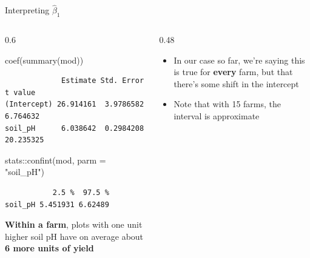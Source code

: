 \documentclass[
  ignorenonframetext,
  aspectratio=169,
]{beamer}
\newenvironment{Shaded}{\begin{snugshade}}{\end{snugshade}}
\newcommand{\AttributeTok}[1]{\textcolor[rgb]{0.40,0.45,0.13}{#1}}
\newcommand{\FunctionTok}[1]{\textcolor[rgb]{0.28,0.35,0.67}{#1}}
\newcommand{\NormalTok}[1]{\textcolor[rgb]{0.00,0.23,0.31}{#1}}
\newcommand{\SpecialCharTok}[1]{\textcolor[rgb]{0.37,0.37,0.37}{#1}}
\newcommand{\StringTok}[1]{\textcolor[rgb]{0.13,0.47,0.30}{#1}}
\providecommand{\tightlist}{%
  \setlength{\itemsep}{0pt}\setlength{\parskip}{0pt}}\usepackage{longtable,booktabs,array}
\begin{document}
\begin{frame}[fragile]{Interpreting \(\hat\beta_1\)}
\label{interpreting-hatbeta_1}
\begin{columns}[T]
\begin{column}{0.6\textwidth}
\begin{Shaded}
\begin{Highlighting}[]
\FunctionTok{coef}\NormalTok{(}\FunctionTok{summary}\NormalTok{(mod))}
\end{Highlighting}
\end{Shaded}

\begin{verbatim}
             Estimate Std. Error   t value
(Intercept) 26.914161  3.9786582  6.764632
soil_pH      6.038642  0.2984208 20.235325
\end{verbatim}

\begin{Shaded}
\begin{Highlighting}[]
\NormalTok{stats}\SpecialCharTok{::}\FunctionTok{confint}\NormalTok{(mod, }\AttributeTok{parm =} \StringTok{"soil\_pH"}\NormalTok{)}
\end{Highlighting}
\end{Shaded}

\begin{verbatim}
           2.5 %  97.5 %
soil_pH 5.451931 6.62489
\end{verbatim}

\vspace{2em}

\textbf{Within a farm}, plots with one unit higher soil pH have on
average about \textbf{6 more units of yield}
\end{column}

\pause

\begin{column}{0.48\textwidth}
\vspace{4em}

\begin{itemize}
\tightlist
\item
  In our case so far, we're saying this is true for \textbf{every} farm,
  but that there's some shift in the intercept
\item
  Note that with 15 farms, the interval is approximate
\end{itemize}
\end{column}
\end{columns}
\end{frame}
\end{document}
